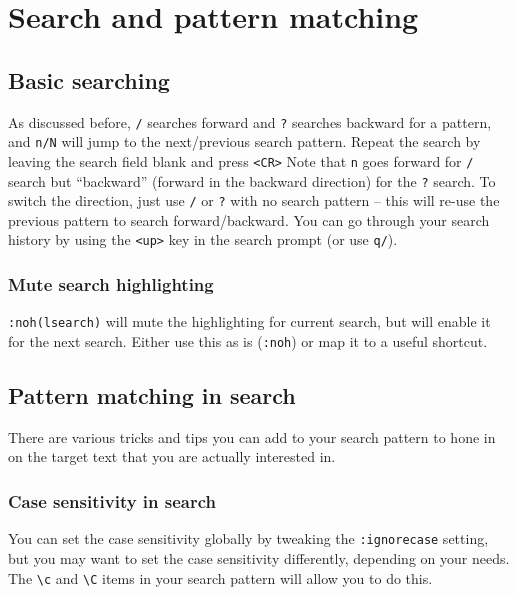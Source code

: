 \chapter{Search and pattern matching}

\section{Basic searching}

As discussed before, \verb|/| searches forward and \verb|?| searches backward for a pattern, and \verb|n/N| will jump to the next/previous search pattern.
Repeat the search by leaving the search field blank and press \verb|<CR>|
Note that \verb|n| goes forward for \verb|/| search but ``backward'' (forward in the backward direction) for the \verb|?| search.
To switch the direction, just use \verb|/| or \verb|?| with no search pattern -- this will re-use the previous pattern to search forward/backward.
You can go through your search history by using the \verb|<up>| key in the search prompt (or use \verb|q/|).

\subsection{Mute search highlighting}

\verb|:noh(lsearch)| will mute the highlighting for current search, but will enable it for the next search.
Either use this as is (\verb|:noh|) or map it to a useful shortcut.

\section{Pattern matching in search}

There are various tricks and tips you can add to your search pattern to hone in  on the target text that you are actually interested in.

\subsection{Case sensitivity in search}

You can set the case sensitivity globally by tweaking the \verb|:ignorecase| setting, but you may want to set the case sensitivity differently, depending on your needs.
The \verb|\c| and \verb|\C| items in your search pattern will allow you to do this.


















